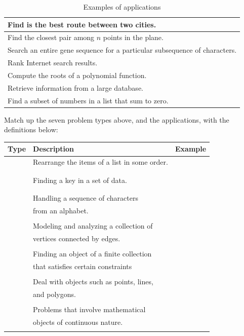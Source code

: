 \documentclass[12pt]{article}
\begin{document}
\begin{table}[h]
    \caption{Examples of applications}
    \begin{tabular}{|l|}
        \hline
        Find is the best route between two cities.\\\hline
        Find the closest pair among $n$ points in the plane. \\\hline
        Search an entire gene sequence for a particular subsequence of characters. \\\hline
        Rank Internet search results. \\\hline
        Compute the roots of a polynomial function. \\\hline
        Retrieve information from a large database. \\\hline
        Find a subset of numbers in a list that sum to zero. \\\hline
    \end{tabular}
\end{table}

Match up the seven problem types above, and the applications, with the definitions below:\\

    \begin{tabular}{|c|l|c|}
        \hline
        Type & Description & Example \\\hline
        \hspace{1.25in} & Rearrange the items of a list in some order. & \hspace{1.5in} \\& & \\
        & & \\\hline
        & Finding a key in a set of data. & \\& & \\
        & & \\\hline
        & Handling a sequence of characters & \\
        & from an alphabet. &\\& & \\\hline
        & Modeling and analyzing a collection of  & \\
        & vertices connected by edges. &  \\& & \\\hline
        & Finding an object of a finite collection & \\
        & that satisfies certain constraints & \\& & \\\hline
        & Deal with objects such as points, lines, & \\
        & and polygons. & \\& & \\\hline
        & Problems that involve mathematical & \\
        & objects of continuous nature. & \\& & \\\hline
    \end{tabular}
\end{document}
